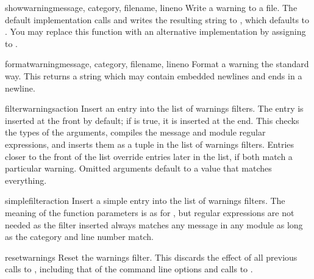 \begin{funcdesc}{showwarning}{message, category, filename,
			     lineno}
Write a warning to a file.  The default implementation calls
 and writes the resulting string to , which
defaults to .  You may replace this function with an
alternative implementation by assigning to
.
\end{funcdesc}

\begin{funcdesc}{formatwarning}{message, category, filename, lineno}
Format a warning the standard way.  This returns a string  which may
contain embedded newlines and ends in a newline.
\end{funcdesc}

\begin{funcdesc}{filterwarnings}{action}
Insert an entry into the list of warnings filters.  The entry is
inserted at the front by default; if  is true, it is
inserted at the end.
This checks the types of the arguments, compiles the message and
module regular expressions, and inserts them as a tuple in the 
list of warnings filters.  Entries closer to the front of the list
override entries later in the list, if both match a particular
warning.  Omitted arguments default to a value that matches
everything.
\end{funcdesc}

\begin{funcdesc}{simplefilter}{action}
Insert a simple entry into the list of warnings filters. The meaning
of the function parameters is as for , but
regular expressions are not needed as the filter inserted always
matches any message in any module as long as the category and line
number match.
\end{funcdesc}

\begin{funcdesc}{resetwarnings}{}
Reset the warnings filter.  This discards the effect of all previous
calls to , including that of the
 command line options and calls to
.
\end{funcdesc}
